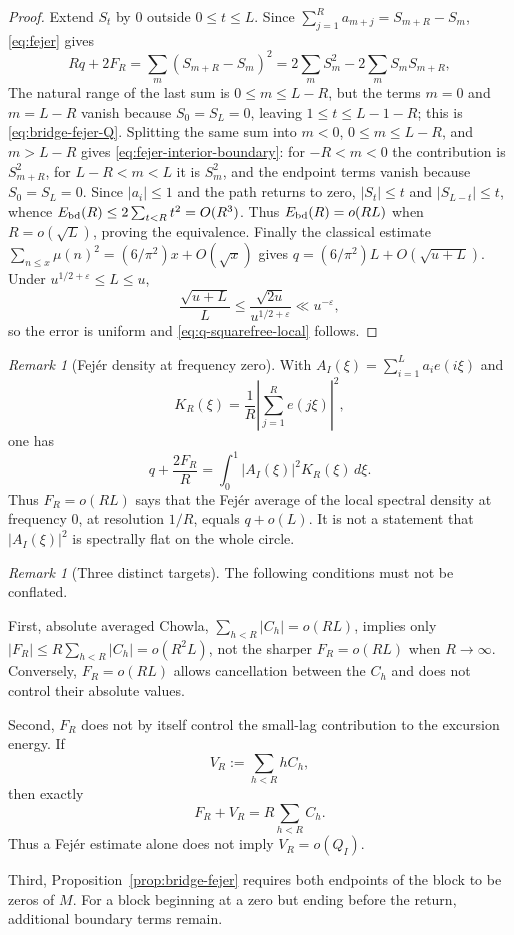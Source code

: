 \documentclass[11pt]{amsart}
\numberwithin{equation}{section}
\theoremstyle{plain}
\theoremstyle{definition}
\theoremstyle{remark}
\newtheorem{remark}[theorem]{Remark}
\newcommand{\eps}{\varepsilon}
\begin{document}
\begin{proof}
Extend $S_t$ by $0$ outside $0\le t\le L$. Since
$\sum_{j=1}^Ra_{m+j}=S_{m+R}-S_m$, \eqref{eq:fejer} gives
\[
Rq+2F_R=\sum_m(S_{m+R}-S_m)^2
=2\sum_mS_m^2-2\sum_mS_mS_{m+R},
\]
The natural range of the last sum is $0\le m\le L-R$, but the terms
$m=0$ and $m=L-R$ vanish because $S_0=S_L=0$, leaving $1\le t\le L-1-R$;
this is \eqref{eq:bridge-fejer-Q}. Splitting the same sum into $m<0$, $0\le m\le L-R$, and $m>L-R$
gives \eqref{eq:fejer-interior-boundary}: for $-R<m<0$ the contribution is
$S_{m+R}^2$, for $L-R<m<L$ it is $S_m^2$, and the endpoint terms vanish
because $S_0=S_L=0$.  Since $|a_i|\le1$ and the path returns
to zero, $|S_t|\le t$ and $|S_{L-t}|\le t$, whence
$E_{\rm bd}(R)\le2\sum_{t<R}t^2=O(R^3)$. Thus
$E_{\rm bd}(R)=o(RL)$ when $R=o(\sqrt L)$, proving the equivalence.
Finally the classical estimate
$\sum_{n\le x}\mu(n)^2=(6/\pi^2)x+O(\sqrt x)$ gives
$q=(6/\pi^2)L+O(\sqrt{u+L})$.  Under
$u^{1/2+\eps}\le L\le u$,
\[
 \frac{\sqrt{u+L}}{L}\le
 \frac{\sqrt{2u}}{u^{1/2+\eps}}\ll u^{-\eps},
\]
so the error is uniform and \eqref{eq:q-squarefree-local} follows.
\end{proof}

\begin{remark}[Fej\'er density at frequency zero]
\label{rem:fejer-spectrum}
With $A_I(\xi)=\sum_{i=1}^La_ie(i\xi)$ and
\[
K_R(\xi)=\frac1R\left|\sum_{j=1}^Re(j\xi)\right|^2,
\]
one has
\[
q+\frac{2F_R}{R}=\int_0^1|A_I(\xi)|^2K_R(\xi)\,d\xi.
\]
Thus $F_R=o(RL)$ says that the Fej\'er average of the local spectral density
at frequency $0$, at resolution $1/R$, equals $q+o(L)$. It is not a
statement that $|A_I(\xi)|^2$ is spectrally flat on the whole circle.
\end{remark}

\begin{remark}[Three distinct targets]
\label{rem:three-chowla-targets}
The following conditions must not be conflated.

First, absolute averaged Chowla,
$\sum_{h<R}|C_h|=o(RL)$, implies only
$|F_R|\le R\sum_{h<R}|C_h|=o(R^2L)$, not the sharper
$F_R=o(RL)$ when $R\to\infty$. Conversely, $F_R=o(RL)$ allows cancellation
between the $C_h$ and does not control their absolute values.

Second, $F_R$ does not by itself control the small-lag contribution to the
excursion energy. If
\[
V_R:=\sum_{h<R}hC_h,
\]
then exactly
\begin{equation}
\label{eq:F-V-relation}
F_R+V_R=R\sum_{h<R}C_h.
\end{equation}
Thus a Fej\'er estimate alone does not imply $V_R=o(Q_I)$.

Third, Proposition~\ref{prop:bridge-fejer} requires both endpoints of the
block to be zeros of $M$. For a block beginning at a zero but ending before
the return, additional boundary terms remain.
\end{remark}
\end{document}
